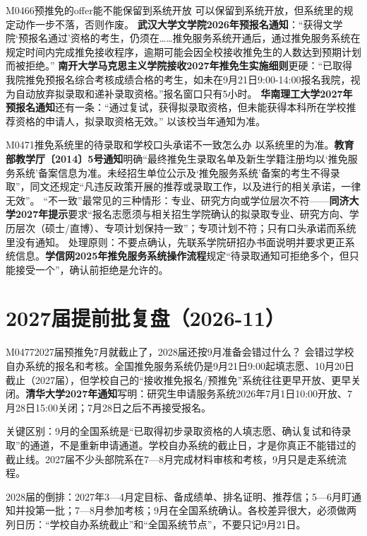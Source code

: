 \begin{qa}{M0466}{预推免的offer能不能保留到系统开放}
可以保留到系统开放，但系统里的规定动作一步不落，否则作废。
\textbf{武汉大学文学院2026年预报名通知}：“获得文学院‘预报名通过’资格的考生，仍须在……推免服务系统开通后，通过推免服务系统在规定时间内完成推免接收程序，逾期可能会因全校接收推免生的人数达到预期计划而被拒绝。”
\textbf{南开大学马克思主义学院接收2027年推免生实施细则}更硬：“已取得我院推免预报名综合考核成绩合格的考生，如未在9月21日9:00-14:00报名我院，视为自动放弃拟录取和递补录取资格。”报名窗口只有5小时。
\textbf{华南理工大学2027年预报名通知}还有一条：“通过复试，获得拟录取资格，但未能获得本科所在学校推荐资格的申请人，拟录取资格无效。”
以该校当年通知为准。
\end{qa}

\begin{qa}{M0471}{推免系统里的待录取和学校口头承诺不一致怎么办}
以系统里的为准。\textbf{教育部教学厅〔2014〕5号通知}明确“最终推免生录取名单及新生学籍注册均以‘推免服务系统’备案信息为准。未经招生单位公示及‘推免服务系统’备案的考生不得录取”，同文还规定“凡违反政策开展的推荐或录取工作，以及进行的相关承诺，一律无效”。
“不一致”最常见的三种情形：专业、研究方向或学位层次不符——\textbf{同济大学2027年提示}要求“报名志愿须与相关招生学院确认的拟录取专业、研究方向、学历层次（硕士/直博）、专项计划保持一致”；专项计划不符；只有口头承诺而系统里没有通知。
处理原则：不要点确认，先联系学院研招办书面说明并要求更正系统信息。\textbf{学信网2025年推免服务系统操作流程}规定“待录取通知可拒绝多个，但只能接受一个”，确认前拒绝是允许的。
\end{qa}


\section{2027届提前批复盘（2026-11）}

\begin{qa}{M0477}{2027届预推免7月就截止了，2028届还按9月准备会错过什么？}
会错过学校自办系统的报名和考核。全国推免服务系统仍是9月21日9:00起填志愿、10月20日截止（2027届），但学校自己的“接收推免报名/预推免”系统往往更早开放、更早关闭。\textbf{清华大学2027年通知}写明：研究生申请服务系统2026年7月1日10:00开放、7月28日15:00关闭；7月28日之后不再接受报名。

关键区别：9月的全国系统是“已取得初步录取资格的人填志愿、确认复试和待录取”的通道，不是重新申请通道。学校自办系统的截止日，才是你真正不能错过的截止线。2027届不少头部院系在7—8月完成材料审核和考核，9月只是走系统流程。

2028届的倒排：2027年3—4月定目标、备成绩单、排名证明、推荐信；5—6月盯通知并投第一批；7—8月参加考核；9月在全国系统确认。各校差异很大，必须做两列日历：“学校自办系统截止”和“全国系统节点”，不要只记9月21日。
\end{qa}


